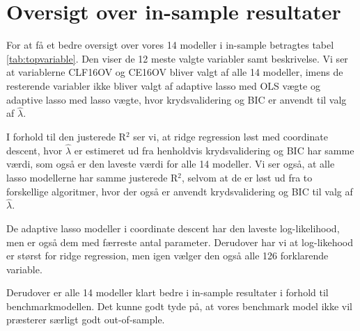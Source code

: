 \section{Oversigt over in-sample resultater} 
For at få et bedre oversigt over vores 14 modeller i in-sample betragtes tabel \ref{tab:topvariable}. Den viser de 12 meste valgte variabler samt beskrivelse. Vi ser at variablerne \textcolor{blue3}{CLF16OV} og \textcolor{blue3}{CE16OV} bliver valgt af alle 14 modeller, imens de resterende variabler ikke bliver valgt af adaptive lasso med OLS vægte og adaptive lasso med lasso vægte, hvor krydsvalidering og BIC er anvendt til valg af $\widehat{\lambda}$. 



I forhold til den justerede R$^2$ ser vi, at ridge regression løst med coordinate descent,
hvor $\widehat{\lambda}$ er estimeret ud fra henholdvis krydsvalidering og BIC har samme værdi, som også er den laveste værdi for alle 14 modeller. 
Vi ser også, at alle lasso modellerne har samme justerede R$^2$, selvom at de er løst ud fra to forskellige algoritmer, hvor der også er anvendt krydsvalidering og BIC til valg af $\widehat{\lambda}$. 

De adaptive lasso modeller i coordinate descent har den laveste log-likelihood, men er også dem med færreste antal parameter. Derudover har vi at log-likehood er størst for ridge regression, men igen vælger den også alle 126 forklarende variable. 

Derudover er alle 14 modeller klart bedre i in-sample resultater i forhold til benchmarkmodellen. Det kunne godt tyde på, at vores benchmark model ikke vil præsterer særligt godt out-of-sample. 